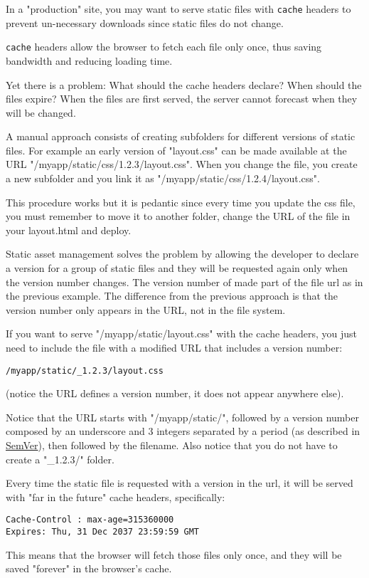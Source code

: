 \documentclass[justified,sixbynine,notoc]{tufte-book}
\def\ft{\small\tt}
\begin{document}
\begin{fullwidth}
In a "production" site, you may want to serve static files with {\ft cache} headers to prevent un-necessary downloads since static files do not change.

{\ft cache} headers allow the browser to fetch each file only once, thus saving bandwidth and reducing loading time.

Yet there is a problem: What should the cache headers declare? When should the files expire? When the files are first served, the server cannot forecast when they will be changed.

A manual approach consists of creating subfolders for different versions of static files. For example an early version of "layout.css" can be made available at the URL "/myapp/static/css/1.2.3/layout.css". When you change the file, you create a new subfolder and you link it as "/myapp/static/css/1.2.4/layout.css".

This procedure works but it is pedantic since every time you update the css file, you must remember to move it to another folder, change the URL of the file in your layout.html and deploy.

Static asset management solves the problem by allowing the developer to declare a version for a group of static files and they will be requested again only when the version number changes. The version number of made part of the file url as in the previous example. The difference from the previous approach is that the version number only appears in the URL, not in the file system.

If you want to serve "/myapp/static/layout.css" with the cache headers, you just need to include the file with a modified URL that includes a version number:
\begin{lstlisting}
/myapp/static/_1.2.3/layout.css
\end{lstlisting}
(notice the URL defines a version number, it does not appear anywhere else).

Notice that the URL starts with "/myapp/static/", followed by a version number composed by an underscore and 3 integers separated by a period (as described in {\footnotesize\href{http://semver.org/}{SemVer}}), then followed by the filename. Also notice that you do not have to create a "\_1.2.3/" folder.

Every time the static file is requested with a version in the url, it will be served with "far in the future" cache headers, specifically:
\begin{lstlisting}
Cache-Control : max-age=315360000
Expires: Thu, 31 Dec 2037 23:59:59 GMT
\end{lstlisting}
This means that the browser will fetch those files only once, and they will be saved "forever" in the browser's cache.


\end{fullwidth}
\end{document}
